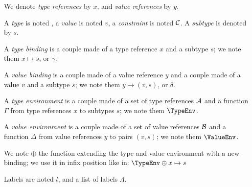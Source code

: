 
We denote \emph{type references} by $x$, and \emph{value references}
by $y$.

A \emph{type} is noted \T, a
\emph{value} is noted $v$, a \emph{constraint} is noted ${\cal C}$. A
\emph{subtype} is denoted by $s$.

A \emph{type binding} is a couple made of a type reference $x$ and a
subtype $s$; we note them $x \mapsto s$, or $\gamma$.

A \emph{value binding} is a couple made of a value reference $y$ and a
couple made of a value $v$ and a subtype $s$; we note them $y \mapsto
(v, s)$, or $\delta$.

A \emph{type environment} is a couple made of a set of type references
${\cal A}$ and a function $\Gamma$ from type references $x$ to
subtypes $s$; we note them $\TypeEnv$.

A \emph{value environment} is a couple made of a set of value
references ${\cal B}$ and a function $\Delta$ from value references
$y$ to pairs $(v,s)$; we note them $\ValueEnv$.

We note $\oplus$ the function extending the type and value environment
with a new binding; we use it in infix position like in: $\TypeEnv
\oplus x \mapsto s$

Labels are noted $l$, and a list of labels $\Lambda$.
